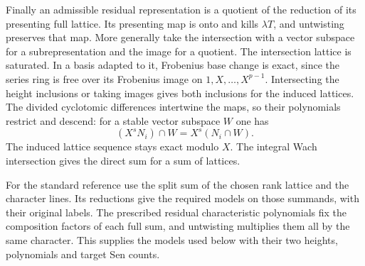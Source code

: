 Finally an admissible residual representation is a quotient
of the reduction of its presenting full lattice. Its presenting
map is onto and kills \(\lambda T\), and untwisting preserves
that map. More generally take the intersection with a vector
subspace for a subrepresentation and the image for a quotient.
The intersection lattice is saturated. In a basis adapted to it,
Frobenius base change is exact, since the series ring is free
over its Frobenius image on \(1,X,\ldots,X^{p-1}\). Intersecting
the height inclusions or taking images gives both inclusions
for the induced lattices. The divided cyclotomic differences
intertwine the maps, so their polynomials restrict and descend:
for a stable vector subspace \(W\) one has
\[
 (X^sN_i)\cap W=X^s(N_i\cap W).
\]
The induced lattice sequence stays
exact modulo \(X\). The integral Wach intersection gives the
direct sum for a sum of lattices.

For the standard reference
use the split sum of the chosen rank lattice and the character
lines. Its reductions give the required models on those
summands, with their original labels. The prescribed residual
characteristic polynomials fix the composition factors of
each full sum, and untwisting multiplies them all by the
same character. This supplies the models used below with
their two heights, polynomials and target Sen counts.
\label{cor:residue-wach-realization-4}
